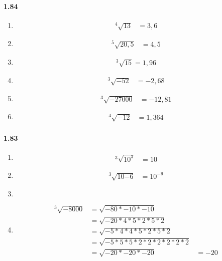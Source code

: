 \documentclass{article}
\newcommand\litem[1]{\item{\bfseries#1\space}}
\begin{document}
\paragraph{1.84}
\begin{enumerate}[label=\emph{\alph*})]
\litem{
\begin{align*}
  ^4\sqrt{13} &= 3,6
\end{align*}
}
\litem{
\begin{align*}
  ^5\sqrt{20,5} &= 4,5
\end{align*}
}
\litem{
\begin{align*}
  ^3\sqrt{15} = 1,96
\end{align*}
}
\litem{
\begin{align*}
  ^3\sqrt{-52} &= -2,68
\end{align*}
}
\litem{
\begin{align*}
  ^3\sqrt{-27 000} &= -12,81
\end{align*}
}
\litem{
\begin{align*}
  ^4\sqrt{-12} &= 1,364
\end{align*}
}
\end{enumerate}

\paragraph{1.83}
\begin{enumerate}[label=\emph{\alph*})]
\litem{
\begin{align*}
  ^3\sqrt{10^3} &= 10
\end{align*}
}
\litem{
\begin{align*}
  ^3\sqrt{10{-6}} &= 10^{-9}
\end{align*}
}
\litem{
\begin{align*}

\end{align*}
}
\litem{
\begin{align*}
  ^3\sqrt{-8000} &= \sqrt{-80 * -10 * -10} \\
  &= \sqrt{-20 * 4 * 5 * 2 * 5 * 2} \\
  &= \sqrt{-5 * 4 * 4 * 5 * 2 * 5 * 2} \\
  &= \sqrt{-5 * 5 * 5 * 2 * 2 * 2 * 2 * 2 * 2} \\
  &= \sqrt{-20 * -20 * -20}
  &= -20
\end{align*}
}
\end{enumerate}
\end{document}
